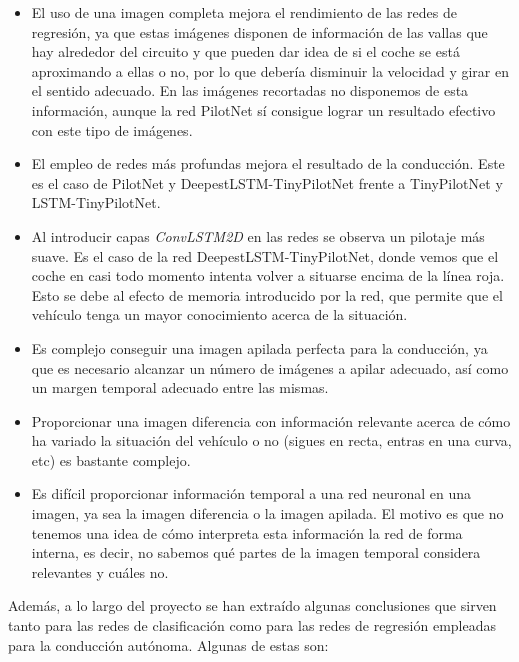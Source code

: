 \begin{itemize}
    \item El uso de una imagen completa mejora el rendimiento de las redes de regresión, ya que estas imágenes disponen de información de las vallas que hay alrededor del circuito y que pueden dar idea de si el coche se está aproximando a ellas o no, por lo que debería disminuir la velocidad y girar en el sentido adecuado. En las imágenes recortadas no disponemos de esta información, aunque la red PilotNet sí consigue lograr un resultado efectivo con este tipo de imágenes.
    
    \item El empleo de redes más profundas mejora el resultado de la conducción. Este es el caso de PilotNet y DeepestLSTM-TinyPilotNet frente a TinyPilotNet y LSTM-TinyPilotNet.
    
    \item Al introducir capas \textit{ConvLSTM2D} en las redes se observa un pilotaje más suave. Es el caso de la red DeepestLSTM-TinyPilotNet, donde vemos que el coche en casi todo momento intenta volver a situarse encima de la línea roja. Esto se debe al efecto de memoria introducido por la red, que permite que el vehículo tenga un mayor conocimiento acerca de la situación.
    
    \item Es complejo conseguir una imagen apilada perfecta para la conducción, ya que es necesario alcanzar un número de imágenes a apilar adecuado, así como un margen temporal adecuado entre las mismas.
    
    \item Proporcionar una imagen diferencia con información relevante acerca de cómo ha variado la situación del vehículo o no (sigues en recta, entras en una curva, etc) es bastante complejo.
    
    \item Es difícil proporcionar información temporal a una red neuronal en una imagen, ya sea la imagen diferencia o la imagen apilada. El motivo es que no tenemos una idea de cómo interpreta esta información la red de forma interna, es decir, no sabemos qué partes de la imagen temporal considera relevantes y cuáles no. 
\end{itemize}


Además, a lo largo del proyecto se han extraído algunas conclusiones que sirven tanto para las redes de clasificación como para las redes de regresión empleadas para la conducción autónoma. Algunas de estas son:\\

